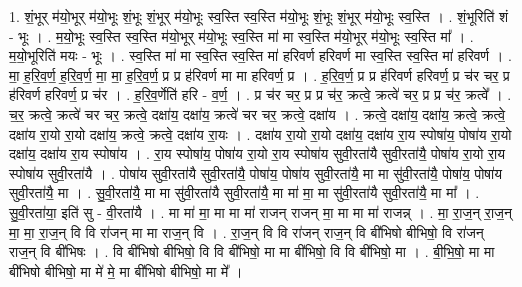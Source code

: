 \documentclass[17pt]{extarticle}
\begin{document}
1. शं॒भूर् म॑यो॒भूर् म॑यो॒भूः शं॒भूः शं॒भूर् म॑यो॒भूः स्व॒स्ति स्व॒स्ति म॑यो॒भूः शं॒भूः शं॒भूर् म॑यो॒भूः स्व॒स्ति । . शं॒भूरिति॑ शं - भूः । . म॒यो॒भूः स्व॒स्ति स्व॒स्ति म॑यो॒भूर् म॑यो॒भूः स्व॒स्ति मा॑ मा स्व॒स्ति म॑यो॒भूर् म॑यो॒भूः स्व॒स्ति मा᳚ । . म॒यो॒भूरिति॑ मयः - भूः । . स्व॒स्ति मा॑ मा स्व॒स्ति स्व॒स्ति मा॑ हरिवर्ण हरिवर्ण मा स्व॒स्ति स्व॒स्ति मा॑ हरिवर्ण । . मा॒ ह॒रि॒व॒र्ण॒ ह॒रि॒व॒र्ण॒ मा॒ मा॒ ह॒रि॒व॒र्ण॒ प्र प्र ह॑रिवर्ण मा मा हरिवर्ण॒ प्र । . ह॒रि॒व॒र्ण॒ प्र प्र ह॑रिवर्ण हरिवर्ण॒ प्र च॑र चर॒ प्र ह॑रिवर्ण हरिवर्ण॒ प्र च॑र । . ह॒रि॒व॒र्णेति॑ हरि - व॒र्ण॒ । . प्र च॑र चर॒ प्र प्र च॑र॒ क्रत्वे॒ क्रत्वे॑ चर॒ प्र प्र च॑र॒ क्रत्वे᳚ । . च॒र॒ क्रत्वे॒ क्रत्वे॑ चर चर॒ क्रत्वे॒ दक्षा॑य॒ दक्षा॑य॒ क्रत्वे॑ चर चर॒ क्रत्वे॒ दक्षा॑य । . क्रत्वे॒ दक्षा॑य॒ दक्षा॑य॒ क्रत्वे॒ क्रत्वे॒ दक्षा॑य रा॒यो रा॒यो दक्षा॑य॒ क्रत्वे॒ क्रत्वे॒ दक्षा॑य रा॒यः । . दक्षा॑य रा॒यो रा॒यो दक्षा॑य॒ दक्षा॑य रा॒य स्पोषा॑य॒ पोषा॑य रा॒यो दक्षा॑य॒ दक्षा॑य रा॒य स्पोषा॑य । . रा॒य स्पोषा॑य॒ पोषा॑य रा॒यो रा॒य स्पोषा॑य सुवी॒रता॑यै सुवी॒रता॑यै॒ पोषा॑य रा॒यो रा॒य स्पोषा॑य सुवी॒रता॑यै । . पोषा॑य सुवी॒रता॑यै सुवी॒रता॑यै॒ पोषा॑य॒ पोषा॑य सुवी॒रता॑यै॒ मा मा सु॑वी॒रता॑यै॒ पोषा॑य॒ पोषा॑य सुवी॒रता॑यै॒ मा । . सु॒वी॒रता॑यै॒ मा मा सु॑वी॒रता॑यै सुवी॒रता॑यै॒ मा मा॑ मा॒ मा सु॑वी॒रता॑यै सुवी॒रता॑यै॒ मा मा᳚ । . सु॒वी॒रता॑या॒ इति॑ सु - वी॒रता॑यै । . मा मा॑ मा॒ मा मा मा॑ राजन् राजन् मा॒ मा मा मा॑ राजन्न् । . मा॒ रा॒ज॒न् रा॒ज॒न् मा॒ मा॒ रा॒ज॒न् वि वि रा॑जन् मा मा राज॒न् वि । . रा॒ज॒न् वि वि रा॑जन् राज॒न् वि बी॑भिषो बीभिषो॒ वि रा॑जन् राज॒न् वि बी॑भिषः । . वि बी॑भिषो बीभिषो॒ वि वि बी॑भिषो॒ मा मा बी॑भिषो॒ वि वि बी॑भिषो॒ मा । . बी॒भि॒षो॒ मा मा बी॑भिषो बीभिषो॒ मा मे॑ मे॒ मा बी॑भिषो बीभिषो॒ मा मे᳚ । \newline
\end{document}
